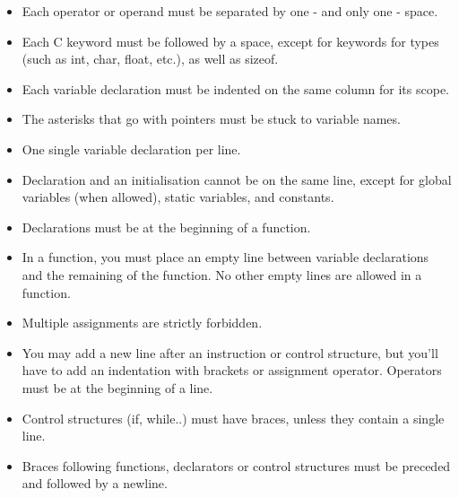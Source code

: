 \documentclass{42-en}
\begin{document}
\begin{itemize}
                \item Each operator or operand must be separated by one
                 - and only one - space.

                \item Each C keyword must be followed by a space, except for
                  keywords for types (such as int, char, float, etc.),
                  as well as sizeof.

                \item Each variable declaration must be indented on the same
                  column for its scope.

                \item The asterisks that go with pointers must be stuck to
                  variable names.

                \item One single variable declaration per line.

                \item Declaration and an initialisation cannot be
                  on the same line, except for global variables (when allowed),
                  static variables, and constants.

                \item Declarations must be at the beginning of a function.

                \item In a function, you must place an empty line between
                    variable declarations and the remaining of the function.
                    No other empty lines are allowed in a function.

                \item Multiple assignments are strictly forbidden.

                \item You may add a new line after an instruction or
                  control structure, but you'll have to add an
                  indentation with brackets or assignment operator.
                  Operators must be at the beginning of a line.

                \item Control structures (if, while..) must have braces, unless they contain a single
                    line.

                \item Braces following functions, declarators or control structures must be preceded and followed by a newline.

            \end{itemize}
\end{document}

